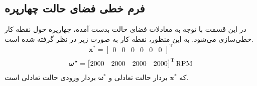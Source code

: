 \subsection{فرم خطی فضای حالت چهارپره}\label{lin_MIMO}
در این قسمت با توجه به معادلات فضای حالت بدست آمده، چهارپره حول نقطه کار خطی‌سازی می‌شود. به این منظور، نقطه کار به صورت زیر در نظر گرفته شده است.
\begin{equation}
	\boldsymbol{x^*} = \begin{bmatrix} %
		0& 0 & 0 & 0& 0& 0
	\end{bmatrix}^\mathrm{T}
\end{equation}
\begin{equation}
	\boldsymbol{\omega^*} = \begin{bmatrix}
		2000&2000&2000&2000
	\end{bmatrix}^\mathrm{T}\rm{RPM}
\end{equation}
که $\boldsymbol{x^*}$ بردار حالت تعادلی و $\boldsymbol{\omega^*}$ بردار ورودی حالت تعادلی است.
